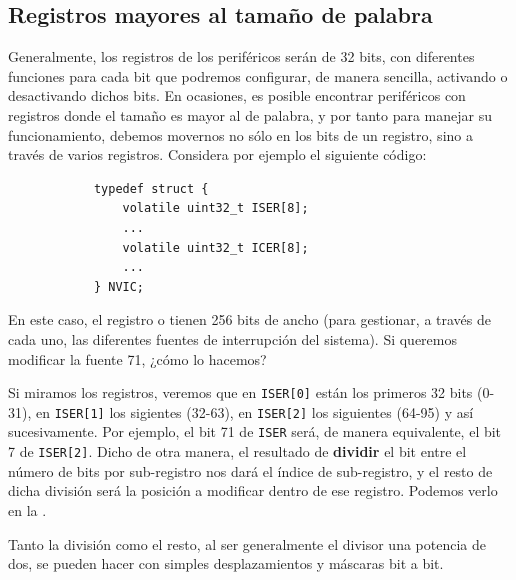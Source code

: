 \documentclass[../main.tex]{subfiles}
\begin{document}
    \subsection{Registros mayores al tamaño de palabra}

        Generalmente, los registros de los periféricos serán de 32 bits, con diferentes funciones para cada bit que podremos configurar, de manera sencilla, activando o desactivando dichos bits. En ocasiones, es posible encontrar periféricos con registros donde el tamaño es mayor al de palabra, y por tanto para manejar su funcionamiento, debemos movernos no sólo en los bits de un registro, sino a través de varios registros. Considera por ejemplo el siguiente código:

        \begin{lstlisting}
            typedef struct {
                volatile uint32_t ISER[8];
                ...
                volatile uint32_t ICER[8];
                ...
            } NVIC;
        \end{lstlisting}

        En este caso, el registro  o  tienen 256 bits de ancho (para gestionar, a través de cada uno, las diferentes fuentes de interrupción del sistema). Si queremos modificar la fuente 71, ¿cómo lo hacemos? 

        Si miramos los registros, veremos que en \texttt{ISER[0]} están los primeros 32 bits (0-31), en \texttt{ISER[1]} los sigientes (32-63), en \texttt{ISER[2]} los siguientes (64-95) y así sucesivamente. Por ejemplo, el bit 71 de \texttt{ISER} será, de manera equivalente, el bit 7 de \texttt{ISER[2]}. Dicho de otra manera, el resultado de \textbf{dividir} el bit entre el número de bits por sub-registro nos dará el índice de sub-registro, y el resto de dicha división será la posición a modificar dentro de ese registro. Podemos verlo en la .

        Tanto la división como el resto, al ser generalmente el divisor una potencia de dos, se pueden hacer con simples desplazamientos y máscaras bit a bit.
\end{document}
